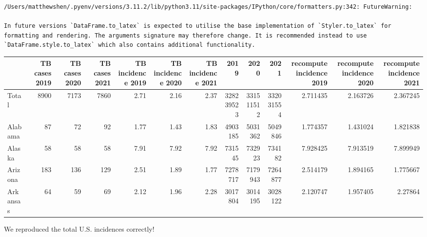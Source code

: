 \documentclass[
  letterpaper,
  DIV=11,
  numbers=noendperiod]{scrreprt}
\begin{document}
\begin{verbatim}
/Users/matthewshen/.pyenv/versions/3.11.2/lib/python3.11/site-packages/IPython/core/formatters.py:342: FutureWarning:

In future versions `DataFrame.to_latex` is expected to utilise the base implementation of `Styler.to_latex` for formatting and rendering. The arguments signature may therefore change. It is recommended instead to use `DataFrame.style.to_latex` which also contains additional functionality.
\end{verbatim}

\begin{tabular}{lrrrrrrrrrrrr}
\toprule
{} &  TB cases 2019 &  TB cases 2020 &  TB cases 2021 &  TB incidence 2019 &  TB incidence 2020 &  TB incidence 2021 &       2019 &       2020 &       2021 &  recompute incidence 2019 &  recompute incidence 2020 &  recompute incidence 2021 \\
\midrule
Total    &           8900 &           7173 &           7860 &               2.71 &               2.16 &               2.37 &  328239523 &  331511512 &  332031554 &                  2.711435 &                  2.163726 &                  2.367245 \\
Alabama  &             87 &             72 &             92 &               1.77 &               1.43 &               1.83 &    4903185 &    5031362 &    5049846 &                  1.774357 &                  1.431024 &                  1.821838 \\
Alaska   &             58 &             58 &             58 &               7.91 &               7.92 &               7.92 &     731545 &     732923 &     734182 &                  7.928425 &                  7.913519 &                  7.899949 \\
Arizona  &            183 &            136 &            129 &               2.51 &               1.89 &               1.77 &    7278717 &    7179943 &    7264877 &                  2.514179 &                  1.894165 &                  1.775667 \\
Arkansas &             64 &             59 &             69 &               2.12 &               1.96 &               2.28 &    3017804 &    3014195 &    3028122 &                  2.120747 &                  1.957405 &                   2.27864 \\
\bottomrule
\end{tabular}

We reproduced the total U.S. incidences correctly!
\end{document}
